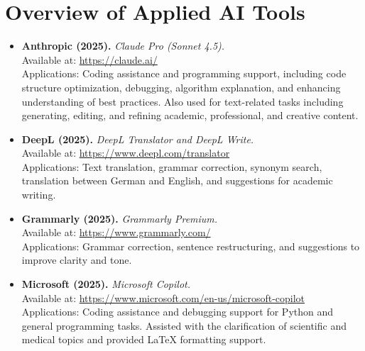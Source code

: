 


\chapter*{Overview of Applied AI Tools}

\begin{itemize}

    \item \textbf{Anthropic (2025).} \textit{Claude Pro (Sonnet 4.5).}\\
    Available at: \url{https://claude.ai/} \\
    Applications: Coding assistance and programming support, including code structure optimization, debugging, algorithm explanation, and enhancing understanding of best practices. Also used for text-related tasks including generating, editing, and refining academic, professional, and creative content.

    \item \textbf{DeepL (2025).} \textit{DeepL Translator and DeepL Write.}\\
    Available at: \url{https://www.deepl.com/translator} \\
    Applications: Text translation, grammar correction, synonym search, translation between German and English, and suggestions for academic writing.

    \item \textbf{Grammarly (2025).} \textit{Grammarly Premium.}\\
    Available at: \url{https://www.grammarly.com/} \\
    Applications: Grammar correction, sentence restructuring, and suggestions to improve clarity and tone.

    \item \textbf{Microsoft (2025).} \textit{Microsoft Copilot.}\\
    Available at: \url{https://www.microsoft.com/en-us/microsoft-copilot} \\
    Applications: Coding assistance and debugging support for Python and general programming tasks. Assisted with the clarification of scientific and medical topics and provided LaTeX formatting support.


\end{itemize}
